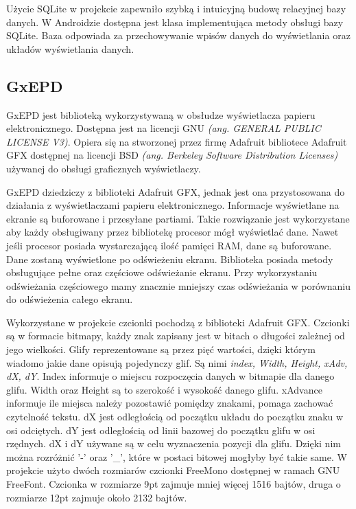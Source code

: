 \documentclass[a4paper,12pt, twoside]{article}
\begin{document}
    	Użycie SQLite w projekcie zapewniło szybką i intuicyjną budowę relacyjnej bazy danych. W Androidzie dostępna jest klasa implementująca metody obsługi bazy SQLite. Baza odpowiada za przechowywanie wpisów danych do wyświetlania oraz układów wyświetlania danych. 
    	
    	\subsection{GxEPD}\label{GxEPD}
    	GxEPD jest biblioteką wykorzystywaną w obsłudze wyświetlacza papieru elektronicznego. Dostępna jest na licencji GNU \textit{(ang. GENERAL PUBLIC LICENSE V3)}. Opiera się na stworzonej przez firmę Adafruit bibliotece Adafruit GFX dostępnej na licencji BSD \textit{(ang. Berkeley Software Distribution Licenses)} używanej do obsługi graficznych wyświetlaczy.
    	
    	GxEPD dziedziczy z biblioteki Adafruit GFX, jednak jest ona przystosowana do działania z wyświetlaczami papieru elektronicznego. Informacje wyświetlane na ekranie są buforowane i przesyłane partiami. Takie rozwiązanie jest wykorzystane aby każdy obsługiwany przez bibliotekę procesor mógł wyświetlać dane. Nawet jeśli procesor posiada wystarczającą ilość pamięci RAM, dane są buforowane. Dane zostaną wyświetlone po odświeżeniu ekranu. Biblioteka posiada metody obsługujące pełne oraz częściowe odświeżanie ekranu. Przy wykorzystaniu odświeżania częściowego mamy znacznie mniejszy czas odświeżania w porównaniu do odświeżenia całego ekranu.
    	
        Wykorzystane w projekcie czcionki pochodzą z biblioteki Adafruit GFX. Czcionki są w formacie bitmapy, każdy znak zapisany jest w bitach o długości zależnej od jego wielkości. Glify reprezentowane są przez pięć wartości, dzięki którym wiadomo jakie dane opisują pojedynczy glif. Są nimi \textit{index,  Width, Height, xAdv, dX, dY}. Index informuje o miejscu rozpoczęcia danych w bitmapie dla danego glifu. Width oraz Height są to szerokość i wysokość danego glifu. xAdvance informuje ile miejsca należy pozostawić pomiędzy znakami, pomaga zachować czytelność tekstu. dX jest odległością od początku układu do początku znaku w osi odciętych. dY jest odległością od linii bazowej do początku glifu w osi rzędnych. dX i dY używane są w celu wyznaczenia pozycji dla glifu. Dzięki nim można rozróżnić '-' oraz '\_', które w postaci bitowej mogłyby być takie same. W projekcie użyto dwóch rozmiarów czcionki FreeMono dostępnej w ramach GNU FreeFont. Czcionka w rozmiarze 9pt zajmuje mniej więcej 1516 bajtów, druga o rozmiarze 12pt zajmuje około 2132 bajtów.
        
\end{document}
